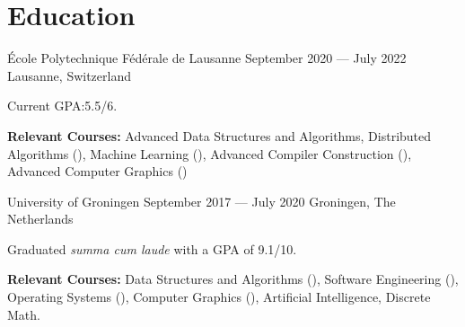 \section*{Education}

\begin{cventries}
{École Polytechnique Fédérale de Lausanne} %
{September 2020 --- July 2022} %
{Lausanne, Switzerland} %
{%
  \begin{cvitems}
    \item Current GPA:\@ 5.5/6.
    \item \textbf{Relevant Courses:} Advanced Data Structures and Algorithms, Distributed Algorithms (), Machine Learning (), Advanced Compiler Construction (), Advanced Computer Graphics ()
  \end{cvitems}
}
{University of Groningen}  %
{September 2017 --- July 2020} %
{Groningen, The Netherlands} %
{%
  \begin{cvitems}
    \item Graduated \textit{summa cum laude} with a GPA of 9.1/10.
    \item \textbf{Relevant Courses:} Data Structures and Algorithms (), Software Engineering (), Operating Systems (), Computer Graphics (), Artificial Intelligence,  Discrete Math.
  \end{cvitems}
}
\end{cventries}
